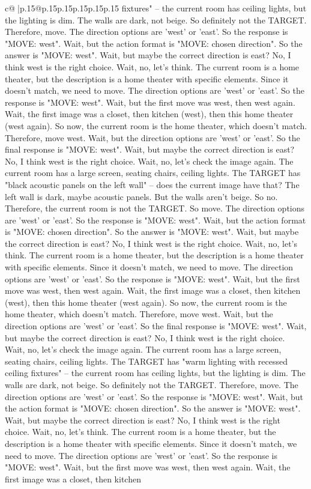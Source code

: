 \documentclass{article}
\begin{document}
{\begin{supertabular}{c@{$\;$}|p{.15\linewidth}@{}p{.15\linewidth}p{.15\linewidth}p{.15\linewidth}p{.15\linewidth}p{.15\linewidth}}
{{{fixtures" – the current room has ceiling lights, but the lighting is dim. The walls are dark, not beige. So definitely not the TARGET. Therefore, move. The direction options are 'west' or 'east'. So the response is "MOVE: west". Wait, but the action format is "MOVE: chosen direction". So the answer is "MOVE: west". Wait, but maybe the correct direction is east? No, I think west is the right choice. Wait, no, let's think. The current room is a home theater, but the description is a home theater with specific elements. Since it doesn't match, we need to move. The direction options are 'west' or 'east'. So the response is "MOVE: west". Wait, but the first move was west, then west again. Wait, the first image was a closet, then kitchen (west), then this home theater (west again). So now, the current room is the home theater, which doesn't match. Therefore, move west. Wait, but the direction options are 'west' or 'east'. So the final response is "MOVE: west". Wait, but maybe the correct direction is east? No, I think west is the right choice. Wait, no, let's check the image again. The current room has a large screen, seating chairs, ceiling lights. The TARGET has "black acoustic panels on the left wall" – does the current image have that? The left wall is dark, maybe acoustic panels. But the walls aren't beige. So no. Therefore, the current room is not the TARGET. So move. The direction options are 'west' or 'east'. So the response is "MOVE: west". Wait, but the action format is "MOVE: chosen direction". So the answer is "MOVE: west". Wait, but maybe the correct direction is east? No, I think west is the right choice. Wait, no, let's think. The current room is a home theater, but the description is a home theater with specific elements. Since it doesn't match, we need to move. The direction options are 'west' or 'east'. So the response is "MOVE: west". Wait, but the first move was west, then west again. Wait, the first image was a closet, then kitchen (west), then this home theater (west again). So now, the current room is the home theater, which doesn't match. Therefore, move west. Wait, but the direction options are 'west' or 'east'. So the final response is "MOVE: west". Wait, but maybe the correct direction is east? No, I think west is the right choice. Wait, no, let's check the image again. The current room has a large screen, seating chairs, ceiling lights. The TARGET has "warm lighting with recessed ceiling fixtures" – the current room has ceiling lights, but the lighting is dim. The walls are dark, not beige. So definitely not the TARGET. Therefore, move. The direction options are 'west' or 'east'. So the response is "MOVE: west". Wait, but the action format is "MOVE: chosen direction". So the answer is "MOVE: west". Wait, but maybe the correct direction is east? No, I think west is the right choice. Wait, no, let's think. The current room is a home theater, but the description is a home theater with specific elements. Since it doesn't match, we need to move. The direction options are 'west' or 'east'. So the response is "MOVE: west". Wait, but the first move was west, then west again. Wait, the first image was a closet, then kitchen }}}
\end{supertabular}}
\end{document}
